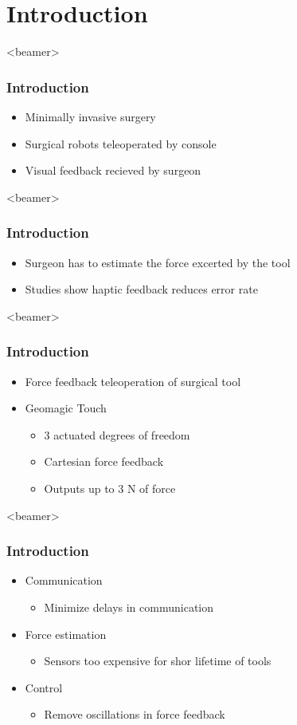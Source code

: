 \section{Introduction}
\begin{frame}<beamer>
\frametitle{Introduction}
\begin{itemize}
\item Minimally invasive surgery 
\item Surgical robots teleoperated by console

\item Visual feedback recieved by surgeon
\end{itemize}
\end{frame}

\begin{frame}<beamer>
\frametitle{Introduction}
\begin{itemize}
\item Surgeon has to estimate the force excerted by the tool
\item Studies show haptic feedback reduces error rate
\end{itemize}
\end{frame}

\begin{frame}<beamer>
\frametitle{Introduction}
\begin{itemize}
\item Force feedback teleoperation of surgical tool
\item Geomagic Touch 
\begin{itemize}
\item 3 actuated degrees of freedom 
\item Cartesian force feedback
\item Outputs up to 3 N of force
\end{itemize}
\end{itemize}
\end{frame}

\begin{frame}<beamer>
\frametitle{Introduction}
\begin{itemize}
\item Communication
\begin{itemize}
\item Minimize delays in communication
\end{itemize}
\item Force estimation
\begin{itemize}
\item Sensors too expensive for shor lifetime of tools
\end{itemize}
\item Control
\begin{itemize}
\item Remove oscillations in force feedback
\end{itemize}
\end{itemize}
\end{frame}